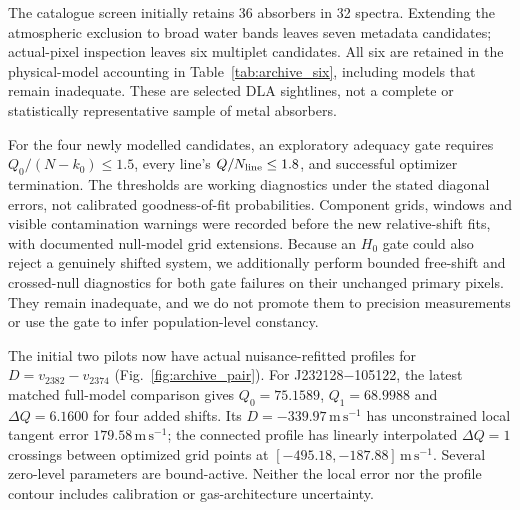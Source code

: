 The catalogue screen initially retains 36 absorbers in 32 spectra. Extending the atmospheric exclusion to broad water bands leaves seven metadata candidates; actual-pixel inspection leaves six multiplet candidates. All six are retained in the physical-model accounting in Table~\ref{tab:archive_six}, including models that remain inadequate. These are selected DLA sightlines, not a complete or statistically representative sample of metal absorbers.

For the four newly modelled candidates, an exploratory adequacy gate requires $Q_0/(N-k_0)\leq1.5$, every line's $Q/N_{\rm line}\leq1.8$, and successful optimizer termination. The thresholds are working diagnostics under the stated diagonal errors, not calibrated goodness-of-fit probabilities. Component grids, windows and visible contamination warnings were recorded before the new relative-shift fits, with documented null-model grid extensions. Because an $H_0$ gate could also reject a genuinely shifted system, we additionally perform bounded free-shift and crossed-null diagnostics for both gate failures on their unchanged primary pixels. They remain inadequate, and we do not promote them to precision measurements or use the gate to infer population-level constancy.

\begin{table}[htbp]
\centering
\caption{Latest matched conventional/free-shift comparisons for all six archive candidates. $n_g$ is the shared gas-component count and $k_\delta$ the number of additional shifts. Values use native pixels and diagonal expected-fluctuation errors. ``Conditional'' permits a model-specific displacement diagnostic, not a calibrated atomic-frequency measurement. ``Inadequate'' retains the post-screen diagnostic comparison on the original primary data. All pairs retain model and optimization limitations described in the text.}
\label{tab:archive_six}
\small

\end{table}

The initial two pilots now have actual nuisance-refitted profiles for $D=v_{2382}-v_{2374}$ (Fig.~\ref{fig:archive_pair}). For J232128$-$105122, the latest matched full-model comparison gives $Q_0=75.1589$, $Q_1=68.9988$ and $\Delta Q=6.1600$ for four added shifts. Its $D=-339.97\,\mathrm{m\,s^{-1}}$ has unconstrained local tangent error $179.58\,\mathrm{m\,s^{-1}}$; the connected profile has linearly interpolated $\Delta Q=1$ crossings between optimized grid points at $[-495.18,-187.88]\,\mathrm{m\,s^{-1}}$. Several zero-level parameters are bound-active. Neither the local error nor the profile contour includes calibration or gas-architecture uncertainty.

